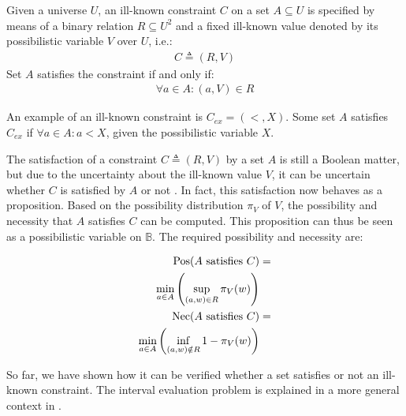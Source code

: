 \begin{definition}
Given a universe $U$, an ill-known constraint $C$ on a set $A \subseteq U$ is specified by means of a binary relation $R \subseteq U^{2}$ and a fixed ill-known value denoted by its possibilistic variable $V$ over $U$, i.e.:
\begin{align}
\label{eq:ill-known-constraint}
C \triangleq (R,V)
\end{align}
Set $A$ satisfies the constraint if and only if:
\begin{align}
\forall a \in A : (a,V) \in R
\end{align}
\end{definition}

An example of an ill-known constraint is $C_{ex} = (<, X)$. Some set $A$ satisfies $C_{ex}$ if $\forall a \in A : a < X$, given the possibilistic variable $X$.

The satisfaction of a constraint $C \triangleq (R,V)$ by a set $A$ is still a Boolean matter, but due to the uncertainty about the ill-known value $V$, it can be uncertain whether $C$ is satisfied by $A$ or not \cite{Pons2011}. In fact, this satisfaction now behaves as a proposition. Based on the possibility distribution $\pi_{V}$ of $V$, the possibility and necessity that $A$ satisfies $C$ can be computed. This proposition can thus be seen as a possibilistic variable on $\mathbb{B}$. The required possibility and necessity are:

\vspace{-10pt}

\begin{align}
\label{ill-known-pos}\
\operatorname{Pos}(A\text{ satisfies }C) & =\\
\nonumber
\min_{a \in A}\left(\sup_{(a,w) \in R}\pi_{V}(w)\right) \\
\label{ill-known-nec}
\operatorname{Nec}(A\text{ satisfies }C) & =\\
\nonumber
\min_{a \in A}\left(\inf_{(a,w) \notin R} 1-\pi_{V}(w)\right) 
\end{align}

So far, we have shown how it can be verified whether a set satisfies or not an ill-known constraint. The interval evaluation problem is explained in a more general context in \cite{Pons2011}.

